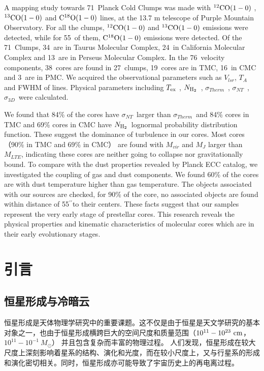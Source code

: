 \documentclass[UTF8, nocolorlinks]{pkuthss}
\newcommand{\coaa}{$\rm^{12}CO(1-0)$ }
\newcommand{\cobb}{$\rm^{13}CO(1-0)$ }
\newcommand{\cocc}{$\rm C^{18}O(1-0)$ }
\newcommand{\texc}{$T_{\rm {ex}}$ }
\newcommand{\nhyd}{$N_{\rm H_2}$\ }
\newcommand{\sigmath}{$\sigma _{Therm}$\ }
\newcommand{\sigmant}{$\sigma _{NT}$\ }
\newcommand{\sigmatd}{$\sigma _{3D}$\ }
\newcommand{\arcsec}{$^{\prime\prime}$}
\newcommand{\numsou}{71\ }
\newcommand{\numsoutmc}{34\ }
\newcommand{\numsoupmc}{13\ }
\newcommand{\numsoucmc}{24\ }
\newcommand{\numcore}{38\ }
\newcommand{\numcoretmc}{19\ }
\newcommand{\numcorepmc}{3\ }
\newcommand{\numcorecmc}{16\ }
\newcommand{\numcocc}{55\ }
\newcommand{\numcompofcores}{27\ }
\newcommand{\numvelcomp}{76\ }
\begin{document}
\begin{eabstract}

	A mapping study towards \numsou Planck Cold Clumps was made with \coaa, \cobb and \cocc lines, at the 13.7 m telescope of Purple Mountain Observatory. For all the clumps, \coaa and \cobb emissions were detected, while for \numcocc of them, \cocc emissions were detected.  Of the \numsou Clumps, \numsoutmc are in Taurus Molecular Complex, \numsoucmc in California  Molecular Complex and \numsoupmc are in Perseus Molecular Complex. In the \numvelcomp velocity components, \numcore cores are found in \numcompofcores clumps, \numcoretmc cores are in TMC, \numcorecmc in CMC and \numcorepmc are in PMC.
    We acquired the observational parameters such as $V_{lsr}$, $T_{A}$ and FWHM of lines. Physical parameters including \texc, \nhyd, \sigmath, \sigmant,  \sigmatd were calculated.

    We found that 84\% of the cores have \sigmant larger than \sigmath and 84\% cores in TMC and 69\% cores in CMC have \nhyd lognormal probability distribution function. These suggest the dominance of turbulence in our cores. Most cores （90\% in TMC and 69\% in CMC） are found with $M_{vir}$ and $M_J$ larger than $M_{LTE}$, indicating these cores are neither going to collapse nor gravitationally bound. To compare with the dust properties revealed by Planck ECC catalog, we investigated the coupling of gas and dust components. We found 60\% of the cores are with dust temperature higher than gas temperature. The objects associated with our sources are checked, for 90\% of the core, no associated objects are found within distance of 55\arcsec to their centers. These facts suggest that our samples represent the very early stage of prestellar cores. This research reveals the physical properties and kinematic characteristics of molecular cores which are in their early evolutionary stages.
\end{eabstract}

	\tableofcontents
	\mainmatter

\chapter{引言}

	\section{恒星形成与冷暗云}\label{Sec.ColdDarkCloud}

		恒星形成是天体物理学研究中的重要课题。这不仅是由于恒星是天文学研究的基本对象之一，也由于恒星形成横跨巨大的空间尺度和质量范围（$\rm 10^{11}-10^{23}\ cm$，$10^{11}-10^{-1}\ M_{\odot}$） 并且包含复杂而丰富的物理过程\supercite{shu1987star}。 人们发现，恒星形成在较大尺度上深刻影响着星系的结构、演化和光度，而在较小尺度上，又与行星系的形成和演化密切相关\supercite{2007ARA&A..45..565M}。同时，恒星形成亦可能导致了宇宙历史上的再电离过程\supercite{2007ARA&A..45..565M,2004ARA&A..42...79B}。
\end{document}

